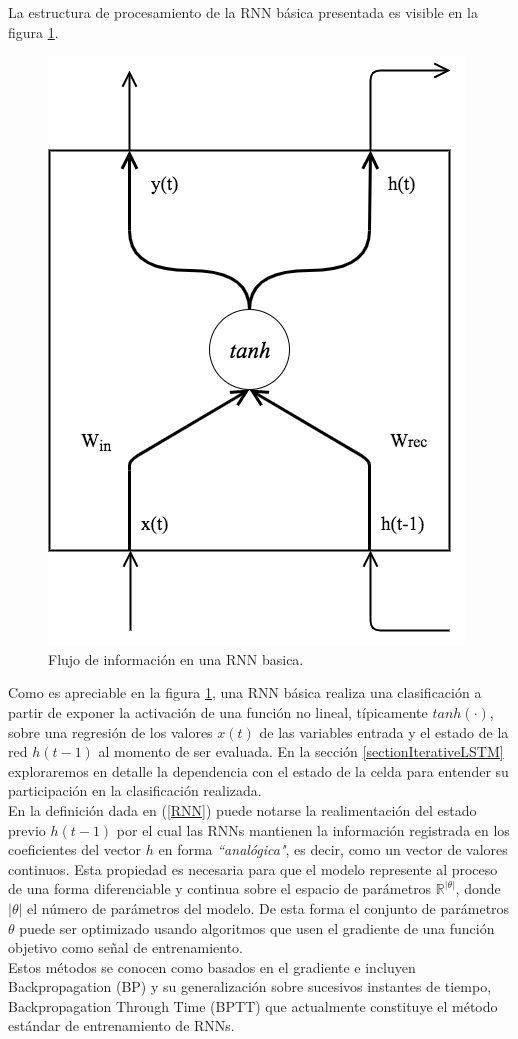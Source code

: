 \documentclass{article}
\begin{document}
	La estructura de procesamiento de la RNN básica presentada es visible en la figura \ref{basicRNN}.
	\begin{figure}[H]
		\centering
		\includegraphics[scale=0.2]{basicRNN}
		\caption{Flujo de información en una RNN basica.}
		\label{basicRNN}
	\end{figure}
	
	Como es apreciable en la figura \ref{basicRNN}, una RNN básica realiza una clasificación a partir de exponer la activación de una función no lineal, típicamente $tanh(\cdot)$, sobre una regresión de los valores $x(t)$ de las variables entrada y el estado de la red $h(t-1)$ al momento de ser evaluada. En la sección \ref{sectionIterativeLSTM} exploraremos en detalle la dependencia con el estado de la celda para entender su participación en la clasificación realizada.\\
	
	En la definición dada en (\ref{RNN}) puede notarse la realimentación del estado previo $h(t-1)$ por el cual las RNNs mantienen la información registrada en los coeficientes del vector $h$ en forma \textit{``analógica"}, es decir, como un vector de valores continuos. Esta propiedad es necesaria para que el modelo represente al proceso de una forma diferenciable y continua sobre el espacio de parámetros $\mathbb{R}^{|\theta|}$, donde $|\theta|$ el número de parámetros del modelo. 
	De esta forma el conjunto de parámetros $\theta$ puede ser optimizado usando algoritmos que usen el gradiente de una función objetivo como señal de entrenamiento. \\
	Estos métodos se conocen como basados en el gradiente\cite{20SutskeverPhdThesis} e incluyen Backpropagation (BP) y su generalización sobre sucesivos instantes de tiempo, Backpropagation Through Time (BPTT) que actualmente constituye el método estándar de entrenamiento de RNNs.\\
	
\end{document}
